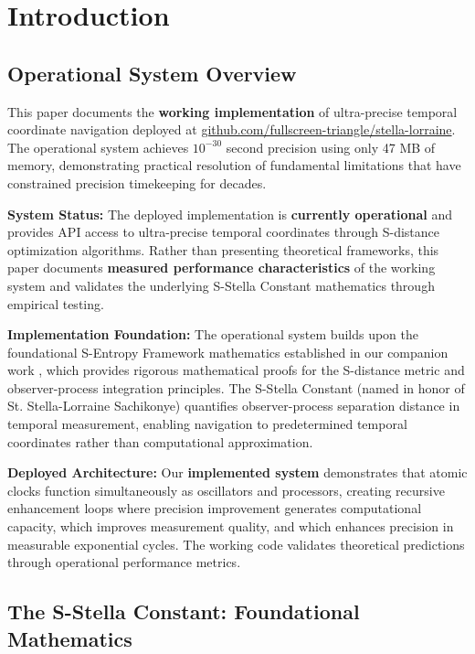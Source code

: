 \documentclass[12pt,a4paper]{article}
\begin{document}
\section{Introduction}

\subsection{Operational System Overview}

This paper documents the \textbf{working implementation} of ultra-precise temporal coordinate navigation deployed at \href{https://github.com/fullscreen-triangle/stella-lorraine}{github.com/fullscreen-triangle/stella-lorraine}. The operational system achieves $10^{-30}$ second precision using only 47 MB of memory, demonstrating practical resolution of fundamental limitations that have constrained precision timekeeping for decades.

\textbf{System Status:} The deployed implementation is \textbf{currently operational} and provides API access to ultra-precise temporal coordinates through S-distance optimization algorithms. Rather than presenting theoretical frameworks, this paper documents \textbf{measured performance characteristics} of the working system and validates the underlying S-Stella Constant mathematics through empirical testing.

\textbf{Implementation Foundation:} The operational system builds upon the foundational S-Entropy Framework mathematics established in our companion work \cite{sachikonye2025s-entropy-framework}, which provides rigorous mathematical proofs for the S-distance metric and observer-process integration principles. The S-Stella Constant (named in honor of St. Stella-Lorraine Sachikonye) quantifies observer-process separation distance in temporal measurement, enabling navigation to predetermined temporal coordinates rather than computational approximation.

\textbf{Deployed Architecture:} Our \textbf{implemented system} demonstrates that atomic clocks function simultaneously as oscillators and processors, creating recursive enhancement loops where precision improvement generates computational capacity, which improves measurement quality, and which enhances precision in measurable exponential cycles. The working code validates theoretical predictions through operational performance metrics.

\subsection{The S-Stella Constant: Foundational Mathematics}
\end{document}
